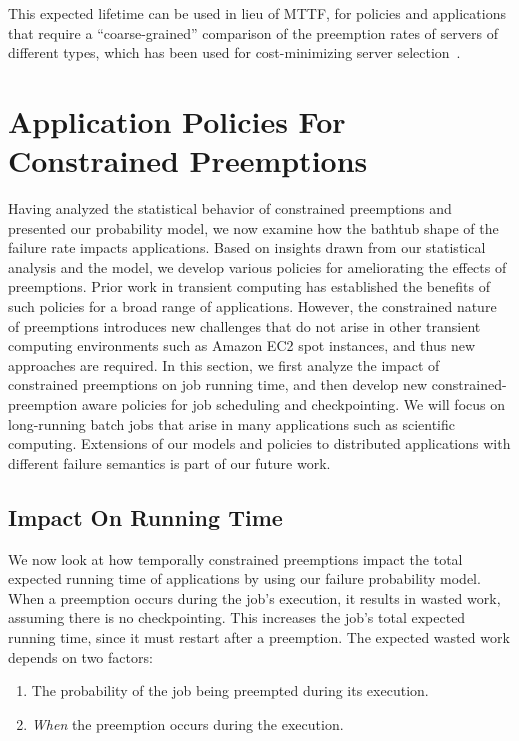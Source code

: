 \documentclass[sigconf]{acmart} %
\newcommand{\subsecspace}[0]{-0.20cm}
\begin{document}
This expected lifetime can be used in lieu of MTTF, for policies and applications that require a ``coarse-grained'' comparison of the preemption rates of servers of different types, which has been used for cost-minimizing server selection~\cite{flint}. 

\vspace*{\subsecspace}
\section{Application Policies For Constrained Preemptions}
\label{sec:policies}
Having analyzed the statistical behavior of constrained preemptions and presented our probability model, we now examine how the bathtub shape of the failure rate impacts applications. 
Based on insights drawn from our statistical analysis and the model, we develop various policies for ameliorating the effects of preemptions. 
Prior work in transient computing has established the benefits of such policies for a broad range of applications. 
However, the constrained nature of preemptions introduces new challenges that do not arise in other transient computing environments such as Amazon EC2 spot instances, and thus new approaches are required. 
In this section, we first analyze the impact of constrained preemptions on job running time, and then develop new constrained-preemption aware policies for job scheduling and checkpointing. 
We will focus on long-running batch jobs that arise in many applications such as scientific computing. Extensions of our models and policies to distributed applications with different failure semantics is part of our future work. 

\vspace*{\subsecspace}
\subsection{Impact On Running Time}

We now look at how temporally constrained preemptions impact the total expected running time of applications by using our failure probability model. 
When a preemption occurs during the job's execution, it results in wasted work, assuming there is no checkpointing. 
This increases the job's total expected running time, since it must restart after a preemption.
The expected wasted work depends on two factors:
\begin{enumerate} [leftmargin=12pt]
\item The probability of the job being preempted during its execution. 
\item \emph{When} the preemption occurs during the execution. 
\end{enumerate}
\end{document}
